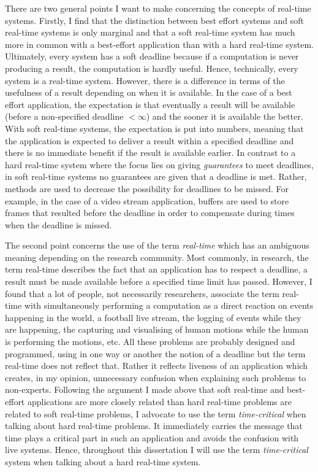 There are two general points I want to make concerning the concepts of real-time systems.
Firstly, I find that the distinction between best effort systems and soft real-time systems is only marginal and that a soft real-time system has much more in common with a best-effort application than with a hard real-time system.
Ultimately, every system has a soft deadline because if a computation is never producing a result, the computation is hardly useful.
Hence, technically, every system is a real-time system.
However, there is a difference in terms of the usefulness of a result depending on when it is available.
In the case of a best effort application, the expectation is that eventually a result will be available (before a non-specified deadline $< \infty$) and the sooner it is available the better.
With soft real-time systems, the expectation is put into numbers, meaning that the application is expected to deliver a result within a specified deadline and there is no immediate benefit if the result is available earlier.
In contrast to a hard real-time system where the focus lies on giving \emph{guarantees} to meet deadlines, in soft real-time systems no guarantees are given that a deadline is met.
Rather, methods are used to decrease the possibility for deadlines to be missed.
For example, in the case of a video stream application, buffers are used to store frames that resulted before the deadline in order to compensate during times when the deadline is missed.

The second point concerns the use of the term \emph{real-time} which has an ambiguous meaning depending on the research community.
Most commonly, in research, the term real-time describes the fact that an application has to respect a deadline, \ie a result must be made available before a specified time limit has passed.
However, I found that a lot of people, not necessarily researchers, associate the term real-time with simultaneously performing a computation as a direct reaction on events happening in the world, \eg a football live stream, the logging of events while they are happening, the capturing and visualising of human motions while the human is performing the motions, etc.
All these problems are probably designed and programmed, using in one way or another the notion of a deadline but the term real-time does not reflect that.
Rather it reflects liveness of an application which creates, in my opinion, unnecessary confusion when explaining such problems to non-experts.
Following the argument I made above that soft real-time and best-effort applications are more closely related than hard real-time problems are related to soft real-time problems, I advocate to use the term \emph{time-critical} when talking about hard real-time problems.
It immediately carries the message that time plays a critical part in such an application and avoids the confusion with live systems.
Hence, throughout this dissertation I will use the term \emph{time-critical} system when talking about a hard real-time system.

